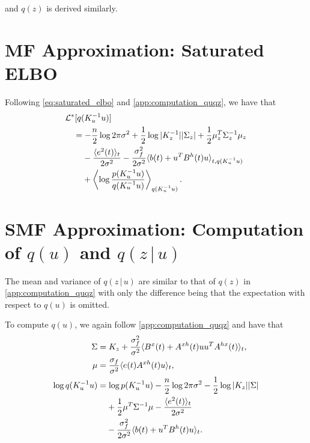 \documentclass{article}
\newcommand{\id}[1]{\, \mathrm{d} #1}     %
\newcommand{\cond}{\, | \,}               %
\renewcommand{\ll}{\left}
\newcommand{\rr}{\right}
\newcommand{\la}{\langle}
\newcommand{\ra}{\rangle}
\newcommand{\phan}[1]{\hphantom{#1\;}}
\begin{document}
and $q(z)$ is derived similarly.

\section{MF Approximation: Saturated ELBO}
\label{app:saturated_elbo}
Following \cref{eq:saturated_elbo} and \cref{app:computation_quqz}, we have that
\begin{align*}
    &\mathcal{L}^*[q(K_u^{-1} u)] \\
    &\quad = - \frac{n}{2}\log 2 \pi \sigma^2 + \frac{1}{2}\log|K_z^{-1}||\Sigma_z| + \frac{1}{2}\mu_z^T \Sigma_z^{-1}\mu_z  \\
    &\quad \phan{=} - \frac{\la e^2(t)\ra_t}{2 \sigma^2}- \frac{\sigma_f^2}{2 \sigma^2}\la b(t) +  u^T B^{h}(t) u \ra_{t,q(K_u^{-1}u)} \\
    &\quad \phan{=}  + \ll\la \log \frac{p(K_u^{-1}u)}{q(K_u^{-1}u)} \rr\ra_{q(K_u^{-1}u)}.
\end{align*}

\section{SMF Approximation: Computation of $q(u)$ and $q(z\cond u)$}
\label{app:computation_quz}
The mean and variance of $q(z\cond u)$ are similar to that of $q(z)$ in \cref{app:computation_quqz} with only the difference being that the expectation with respect to $q(u)$ is omitted.

To compute $q(u)$, we again follow \cref{app:computation_quqz} and have that
\begin{align*}
    \Sigma &= K_z + \frac{\sigma_f^2}{\sigma^2} \la B^x(t) + A^{xh}(t) u u^TA^{hx}(t) \ra_t, \\
    \mu &= \frac{\sigma_f}{\sigma^2}\la e(t) A^{xh}(t)u\ra_{t}, \\
    \log q(K_u^{-1} u) &= \log p(K_u^{-1} u)- \frac{n}{2}\log 2 \pi \sigma^2 -\frac{1}{2}\log|K_z||\Sigma|\\
    &\phan{=}+ \frac{1}{2}\mu^T \Sigma^{-1} \mu- \frac{\la e^2(t)\ra_t}{2 \sigma^2} \\
    &\phan{=}  - \frac{\sigma_f^2}{2 \sigma^2} \la b(t) + u^T B^h(t)u \ra_t.
\end{align*}







\end{document}
